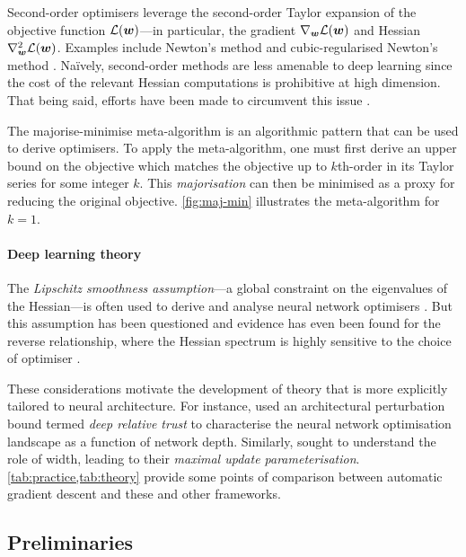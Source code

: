 Second-order optimisers leverage the second-order Taylor expansion of the objective function $\mathcal{L}({\bm{w}})$---in particular, the gradient $\nabla_{\bm{w}}\mathcal{L}({\bm{w}})$ and Hessian $\nabla^2_{\bm{w}}\mathcal{L}({\bm{w}})$. Examples include Newton's method \citep{Nocedal1999NumericalO} and cubic-regularised Newton's method \citep{Nesterov2006CubicRO}. Naïvely, second-order methods are less amenable to deep learning since the cost of the relevant Hessian computations is prohibitive at high dimension. That being said, efforts have been made to circumvent this issue \citep{hessian-linear}.

The majorise-minimise meta-algorithm \citep{mm} is an algorithmic pattern that can be used to derive optimisers. To apply the meta-algorithm, one must first derive an upper bound on the objective which matches the objective up to $k$th-order in its Taylor series for some integer $k$. This \textit{majorisation} can then be minimised as a proxy for reducing the original objective. \cref{fig:maj-min} illustrates the meta-algorithm for $k=1$.

\paragraph{Deep learning theory} The \textit{Lipschitz smoothness assumption}---a global constraint on the eigenvalues of the Hessian---is often used to derive and analyse neural network optimisers \citep{Agarwal2016FindingAL}. But this assumption has been questioned \citep{Zhang2020Why} and evidence has even been found for the reverse relationship, where the Hessian spectrum is highly sensitive to the choice of optimiser \citep{cohen2021gradient}.

These considerations motivate the development of theory that is more explicitly tailored to neural architecture. For instance, \citet{my-fromage} used an architectural perturbation bound termed \textit{deep relative trust} to characterise the neural network optimisation landscape as a function of network depth. Similarly, \citet{Yang2021TensorPI} sought to understand the role of width, leading to their \textit{maximal update parameterisation}. \cref{tab:practice,tab:theory} provide some points of comparison between automatic gradient descent and these and other frameworks.



\subsection{Preliminaries}

